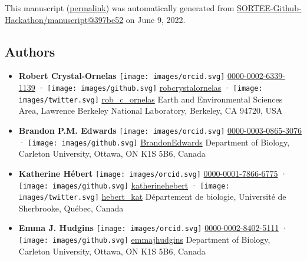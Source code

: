 This manuscript
(\href{https://SORTEE-Github-Hackathon.github.io/manuscript/v/397be525b3f7dd06eb5e7e570a461d840fcb5a26/}{permalink})
was automatically generated
from \href{https://github.com/SORTEE-Github-Hackathon/manuscript/tree/397be525b3f7dd06eb5e7e570a461d840fcb5a26}{SORTEE-Github-Hackathon/manuscript@397be52}
on June 9, 2022.

\hypertarget{authors}{%
\subsection{Authors}\label{authors}}

\begin{itemize}
\item
  \textbf{Robert Crystal-Ornelas}
  \texttt{[image: images/orcid.svg]}
  \href{https://orcid.org/0000-0002-6339-1139}{0000-0002-6339-1139}
  · \texttt{[image: images/github.svg]}
  \href{https://github.com/robcrystalornelas}{robcrystalornelas}
  · \texttt{[image: images/twitter.svg]}
  \href{https://twitter.com/rob_c_ornelas}{rob\_c\_ornelas}
  Earth and Environmental Sciences Area, Lawrence Berkeley National Laboratory, Berkeley, CA 94720, USA
\item
  \textbf{Brandon P.M. Edwards}
  \texttt{[image: images/orcid.svg]}
  \href{https://orcid.org/0000-0003-0865-3076}{0000-0003-0865-3076}
  · \texttt{[image: images/github.svg]}
  \href{https://github.com/BrandonEdwards}{BrandonEdwards}
  Department of Biology, Carleton University, Ottawa, ON K1S 5B6, Canada
\item
  \textbf{Katherine Hébert}
  \texttt{[image: images/orcid.svg]}
  \href{https://orcid.org/0000-0001-7866-6775}{0000-0001-7866-6775}
  · \texttt{[image: images/github.svg]}
  \href{https://github.com/katherinehebert}{katherinehebert}
  · \texttt{[image: images/twitter.svg]}
  \href{https://twitter.com/hebert_kat}{hebert\_kat}
  Département de biologie, Université de Sherbrooke, Québec, Canada
\item
  \textbf{Emma J. Hudgins}
  \texttt{[image: images/orcid.svg]}
  \href{https://orcid.org/0000-0002-8402-5111}{0000-0002-8402-5111}
  · \texttt{[image: images/github.svg]}
  \href{https://github.com/emmajhudgins}{emmajhudgins}
  Department of Biology, Carleton University, Ottawa, ON K1S 5B6, Canada

\end{itemize}
